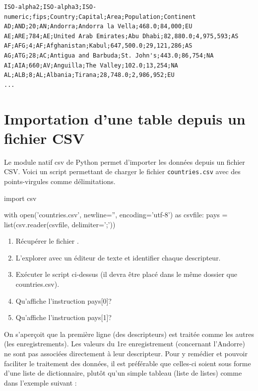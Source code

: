 \begin{lstlisting}[numbers=none]
ISO-alpha2;ISO-alpha3;ISO-numeric;fips;Country;Capital;Area;Population;Continent
AD;AND;20;AN;Andorra;Andorra la Vella;468.0;84,000;EU
AE;ARE;784;AE;United Arab Emirates;Abu Dhabi;82,880.0;4,975,593;AS
AF;AFG;4;AF;Afghanistan;Kabul;647,500.0;29,121,286;AS
AG;ATG;28;AC;Antigua and Barbuda;St. John's;443.0;86,754;NA
AI;AIA;660;AV;Anguilla;The Valley;102.0;13,254;NA
AL;ALB;8;AL;Albania;Tirana;28,748.0;2,986,952;EU
...
\end{lstlisting}

\pagebreak

\section{Importation d'une table depuis un fichier CSV}

Le module natif csv de Python permet d'importer les données depuis un fichier CSV.
Voici un script permettant de charger le fichier \verb|countries.csv| avec des points-virgules comme délimitations.


\begin{CodePythontexAlt}[Largeur=1\linewidth,Centre,PremLigne=1, lineNumbers=false]{}
import csv

with open('countries.csv', newline='', encoding='utf-8') as csvfile:
    pays = list(csv.reader(csvfile, delimiter=';'))
\end{CodePythontexAlt}


\begin{exercice_cours}{}
\begin{enumerate}
	\item  Récupérer le fichier .
	\item L'explorer avec un éditeur de texte et identifier chaque descripteur.
	\item Exécuter le script ci-dessus (il devra être placé dans le même dossier que countries.csv).
	\item Qu'affiche l'instruction pays[0]?
	\item Qu'affiche l'instruction pays[1]?
\end{enumerate}
\end{exercice_cours}

\begin{remarque}{\quad}{}
    On s'aperçoit que la première ligne (des descripteurs) est traitée comme les autres (les enregistrements).
    Les valeurs du 1re enregistrement (concernant l'Andorre) ne sont pas associées directement à leur descripteur. Pour y remédier et pouvoir faciliter le traitement des données, il est préférable que celles-ci soient sous forme d'une liste de dictionnaire, plutôt qu'un simple tableau (liste de listes) comme dans l'exemple suivant :
\end{remarque}


